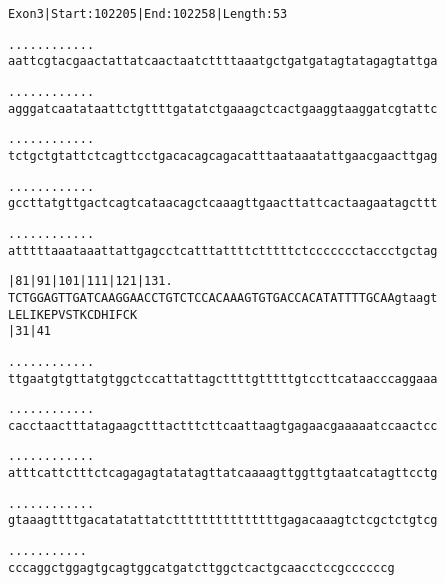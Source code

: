 \documentclass{article}
\begin{document}
\newpage
\begin{alltt}
Exon 3 | Start: 102205 | End: 102258 | Length: 53

.    .    .    .    .    .    .    .    .    .    .    .    
aattcgtacgaactattatcaactaatcttttaaatgctgatgatagtatagagtattga

.    .    .    .    .    .    .    .    .    .    .    .    
agggatcaatataattctgttttgatatctgaaagctcactgaaggtaaggatcgtattc

.    .    .    .    .    .    .    .    .    .    .    .    
tctgctgtattctcagttcctgacacagcagacatttaataaatattgaacgaacttgag

.    .    .    .    .    .    .    .    .    .    .    .    
gccttatgttgactcagtcataacagctcaaagttgaacttattcactaagaatagcttt

.    .    .    .    .    .    .    .    .    .    .    .    
atttttaaataaattattgagcctcatttattttctttttctccccccctaccctgctag

|81       |91       |101      |111      |121      |131    . 
TCTGGAGTTGATCAAGGAACCTGTCTCCACAAAGTGTGACCACATATTTTGCAAgtaagt
 L  E  L  I  K  E  P  V  S  T  K  C  D  H  I  F  C  K       
          |31                           |41                 

   .    .    .    .    .    .    .    .    .    .    .    . 
ttgaatgtgttatgtggctccattattagcttttgtttttgtccttcataacccaggaaa

   .    .    .    .    .    .    .    .    .    .    .    . 
cacctaactttatagaagctttactttcttcaattaagtgagaacgaaaaatccaactcc

   .    .    .    .    .    .    .    .    .    .    .    . 
atttcattctttctcagagagtatatagttatcaaaagttggttgtaatcatagttcctg

   .    .    .    .    .    .    .    .    .    .    .    . 
gtaaagttttgacatatattatctttttttttttttttgagacaaagtctcgctctgtcg

   .    .    .    .    .    .    .    .    .    .    .
cccaggctggagtgcagtggcatgatcttggctcactgcaacctccgccccccg
\end{alltt}
\newpage
\end{document}

